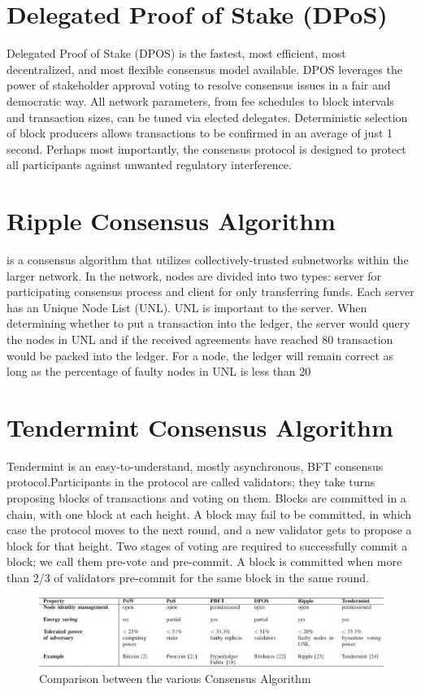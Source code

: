 \documentclass[12pt]{report}
\begin{document}
\section{Delegated Proof of Stake (DPoS)}
\par Delegated Proof of Stake (DPOS) is the fastest, most efficient, most decentralized, and most flexible consensus model available. DPOS leverages the power of stakeholder approval voting to resolve consensus issues in a fair and democratic way. All network parameters, from fee schedules to block intervals and transaction sizes, can be tuned via elected delegates. Deterministic selection of block producers allows transactions to be confirmed in an average of just 1 second. Perhaps most importantly, the consensus protocol is designed to protect all participants against unwanted regulatory interference.
\section{Ripple Consensus Algorithm}
\par  is a consensus algorithm that utilizes
collectively-trusted subnetworks within the larger network. In
the network, nodes are divided into two types: server for
participating consensus process and client for only transferring
funds. Each server has an Unique Node List (UNL). UNL is
important to the server. When determining whether to put a
transaction into the ledger, the server would query the nodes
in UNL and if the received agreements have reached 80%
transaction would be packed into the ledger. For a node, the
ledger will remain correct as long as the percentage of faulty
nodes in UNL is less than 20%
\section{Tendermint Consensus Algorithm}
\par Tendermint is an easy-to-understand, mostly asynchronous, BFT consensus protocol.Participants in the protocol are called validators; they take turns proposing blocks of transactions and voting on them. Blocks are committed in a chain, with one block at each height. A block may fail to be committed, in which case the protocol moves to the next round, and a new validator gets to propose a block for that height. Two stages of voting are required to successfully commit a block; we call them pre-vote and pre-commit. A block is committed when more than 2/3 of validators pre-commit for the same block in the same round.
\begin{figure}
    \centering
    \includegraphics[width=14cm]{Table-2.JPG}
    \caption{Comparison between the various Consensus Algorithm}
    \label{fig:1}
\end{figure}
\end{document}
